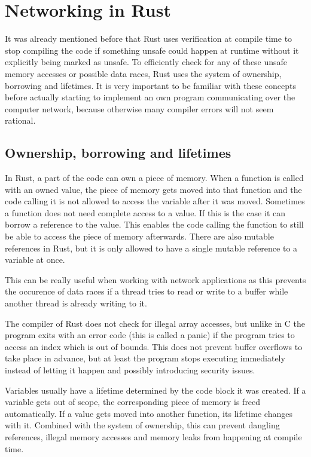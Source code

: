
\section{Networking in Rust} \label{networking-in-rust}
It was already mentioned before that Rust uses verification at compile time to stop compiling the code if something
unsafe could happen at runtime without it explicitly being marked as unsafe. To efficiently check for any of these
unsafe memory accesses or possible data races, Rust uses the system of ownership, borrowing and lifetimes. It is very
important to be familiar with these concepts before actually starting to implement an own program communicating over
the computer network, because otherwise many compiler errors will not seem rational.

\subsection{Ownership, borrowing and lifetimes}
In Rust, a part of the code can own a piece of memory. When a function is called with an owned value, the piece of
memory gets moved into that function and the code calling it is not allowed to access the variable after it was moved.
Sometimes a function does not need complete access to a value. If this is the case it can borrow a reference to the
value. This enables the code calling the function to still be able to access the piece of memory afterwards. There are
also mutable references in Rust, but it is only allowed to have a single mutable reference to a variable at once.

This can be really useful when working with network applications as this prevents the occurence of data races if a
thread tries to read or write to a buffer while another thread is already writing to it.

The compiler of Rust does not check for illegal array accesses, but unlike in C the program exits with an error code
(this is called a panic) if the program tries to access an index which is out of bounds. This does not prevent buffer
overflows to take place in advance, but at least the program stops executing immediately instead of letting it happen
and possibly introducing security issues.

Variables usually have a lifetime determined by the code block it was created. If a variable gets out of scope, the
corresponding piece of memory is freed automatically. If a value gets moved into another function, its lifetime changes
with it. Combined with the system of ownership, this can prevent dangling references, illegal memory accesses and
memory leaks from happening at compile time. \cite{c15safe}

